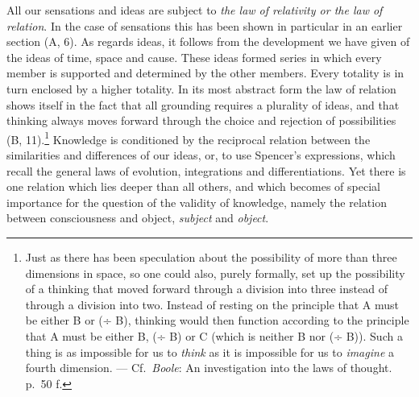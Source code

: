 \documentclass[12pt,a4paper]{book}
\newcommand{\opage}[1]{\marginnote{\footnotesize\textit{[#1]}}}
\begin{document}
All our sensations and ideas are subject to \emph{the law of relativity
or the law of relation}. In the case of sensations this has been shown
in particular in an earlier section (A, 6). As regards ideas, it follows
from the development we have given of the ideas of time, space and
cause. These ideas formed series in which every member is supported and
determined by the other members. Every totality is in turn enclosed by a
higher totality. In its most abstract form the law of relation shows
itself in the fact that all grounding requires a plurality of ideas, and
that thinking always moves forward through
\opage{264}the choice and rejection of possibilities (B, 11).\footnote{Just
as there has been speculation about the possibility of more than three
dimensions in space, so one could also, purely formally, set up the
possibility of a thinking that moved forward through a division into
three instead of through a division into two. Instead of resting on the
principle that A must be either B or (÷ B), thinking would then function
according to the principle that A must be either B, (÷ B) or C (which is
neither B nor (÷ B)). Such a thing is as impossible for us to
\emph{think} as it is impossible for us to \emph{imagine} a fourth
dimension. --- Cf.\ \emph{Boole}: An investigation into the laws of
thought. p.~50 f.} Knowledge is conditioned by the reciprocal relation
between the similarities and differences of our ideas, or, to use
Spencer's expressions, which recall the general laws of evolution,
integrations and differentiations. Yet there is one relation which lies
deeper than all others, and which becomes of special importance for the
question of the validity of knowledge, namely the relation between
consciousness and object, \emph{subject} and \emph{object}.
\end{document}
